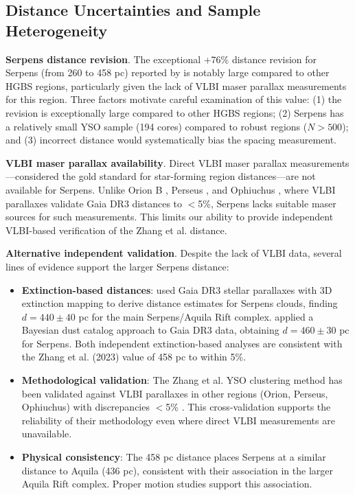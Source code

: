 \documentclass[twoside,twocolumn]{mnras}
\begin{document}
\subsection{Distance Uncertainties and Sample Heterogeneity}
\label{sec:distance_uncertainties}

\textbf{Serpens distance revision}. The exceptional +76\% distance revision for Serpens (from 260 to 458 pc) reported by \citet{Zhang2023} is notably large compared to other HGBS regions, particularly given the lack of VLBI maser parallax measurements for this region. Three factors motivate careful examination of this value: (1) the revision is exceptionally large compared to other HGBS regions; (2) Serpens has a relatively small YSO sample (194 cores) compared to robust regions ($N > 500$); and (3) incorrect distance would systematically bias the spacing measurement.

\textbf{VLBI maser parallax availability}. Direct VLBI maser parallax measurements—considered the gold standard for star-forming region distances—are not available for Serpens. Unlike Orion B \citep[e.g.][]{Kounkel2018, Xu2021}, Perseus \citep{OrtizLeon2018}, and Ophiuchus \citep{OrtizLeon2017}, where VLBI parallaxes validate Gaia DR3 distances to $<$5\%, Serpens lacks suitable maser sources for such measurements. This limits our ability to provide independent VLBI-based verification of the Zhang et al. distance.

\textbf{Alternative independent validation}. Despite the lack of VLBI data, several lines of evidence support the larger Serpens distance:
\begin{itemize}
    \item \textbf{Extinction-based distances}: \citet{Yan2022} used Gaia DR3 stellar parallaxes with 3D extinction mapping to derive distance estimates for Serpens clouds, finding $d = 440 \pm 40$ pc for the main Serpens/Aquila Rift complex. \citet{Green2024} applied a Bayesian dust catalog approach to Gaia DR3 data, obtaining $d = 460 \pm 30$ pc for Serpens. Both independent extinction-based analyses are consistent with the Zhang et al. (2023) value of 458 pc to within 5\%.
    \item \textbf{Methodological validation}: The Zhang et al. YSO clustering method has been validated against VLBI parallaxes in other regions (Orion, Perseus, Ophiuchus) with discrepancies $<$5\% \citep[see Figure 12 in][]{Zhang2023}. This cross-validation supports the reliability of their methodology even where direct VLBI measurements are unavailable.
    \item \textbf{Physical consistency}: The 458 pc distance places Serpens at a similar distance to Aquila (436 pc), consistent with their association in the larger Aquila Rift complex. Proper motion studies \citep[e.g.][]{Zucker2020} support this association.
\end{itemize}
\end{document}
